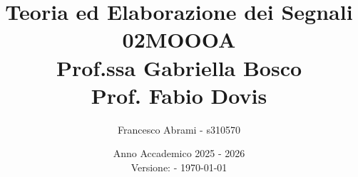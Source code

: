 \lstset{style=matstyle} %



\newtheorem*{theorem*}{Teorema}
\newtheorem*{lemma}{Lemma}
\newtheorem*{corollary}{Corollario}
\newtheorem*{prop*}{Proprietà}
\newtheorem*{definition*}{Definizione}



\graphicspath{ {./images/} }


\usepackage[a4paper,
    textwidth=15.5cm,
    textheight=23.0cm,
    top=2.75cm,
    inner=2.5cm,
    outer=2.5cm
]{geometry}


\newcommand{\unit}[1]{\ensuremath{\, \mathrm{#1}}}
\renewcommand{\dateseparator}{-}


\title{\textbf{Teoria ed Elaborazione dei Segnali \\  02MOOOA \\ Prof.ssa Gabriella Bosco \\ Prof. Fabio Dovis}}
\author{Francesco Abrami - s310570}
\date{Anno Accademico 2025 - 2026 \\ \vspace{10pt} \small {Versione: \version \;- \today}}

























